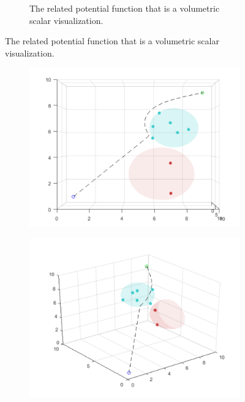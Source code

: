 \documentclass{IEEEtaes}
\begin{document}
{\begin{figure}
\begin{subfigure}{.5\columnwidth}
    \caption{The related potential function that is a volumetric scalar visualization.}
  \end{subfigure}%
\end{figure}







\begin{figure}
  \begin{subfigure}{0.33\textwidth}
    \includegraphics[width=\linewidth]{three-3.pdf}
    \caption{}
    \label{fig:figure1}
  \end{subfigure}%
  \hfill
  \begin{subfigure}{0.33\textwidth}
    \includegraphics[width=\linewidth]{three-1.pdf}

\end{subfigure}
\end{figure}}
\end{document}
